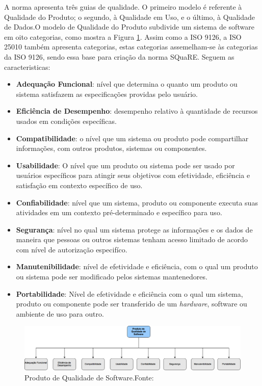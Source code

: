 A norma apresenta três guias de qualidade. O primeiro modelo é referente à Qualidade do Produto; o segundo, à Qualidade em Uso, e o último, à Qualidade de Dados.O modelo de Qualidade do Produto subdivide um sistema de software em oito categorias, como mostra a Figura \ref{img:modelo_square}.
Assim como a ISO 9126, a ISO 25010 também apresenta categorias, estas categorias assemelham-se às categorias da ISO 9126, sendo essa base para criação da norma SQuaRE. Seguem as caracteristicas:

\begin{itemize}
\item \textbf{Adequação Funcional}: nível que determina o quanto um produto ou sistema satisfazem as especificações providas pelo usuário.
\item \textbf{Eficiência de Desempenho}: desempenho relativo à quantidade de recursos usados em condições específicas.
\item \textbf{Compatibilidade}: o nível que um sistema ou produto pode compartilhar informações, com outros produtos, sistemas ou componentes.
\item \textbf{Usabilidade}: O nível que um produto ou sistema pode ser usado por usuários específicos para atingir seus objetivos com efetividade, eficiência e satisfação em contexto específico de uso.
\item \textbf{Confiabilidade}: nível que um sistema, produto ou componente executa suas atividades em um contexto pré-determinado e específico para uso.
\item \textbf{Segurança}: nível no qual um sistema protege as informações e os dados de maneira que pessoas ou outros sistemas tenham acesso limitado de acordo com nível de autorização especifíco.
\item \textbf{Manutenibilidade}: nível de efetividade e eficiência, com o qual um produto ou sistema pode ser modificado pelos sistemas mantenedores.
\item \textbf{Portabilidade}: Nível de efetividade e eficiência com o qual um sistema, produto ou componente pode ser transferido de um \textit{hardware}, software ou ambiente de uso para outro.
\end{itemize}
\graphicspath{{figuras/}}
\begin{figure}[h]
\centering
\includegraphics[scale=0.40]{SQuaRE}
\caption{Produto de Qualidade de Software.Fonte:\cite{Square}}
\label{img:modelo_square}
\end{figure}

